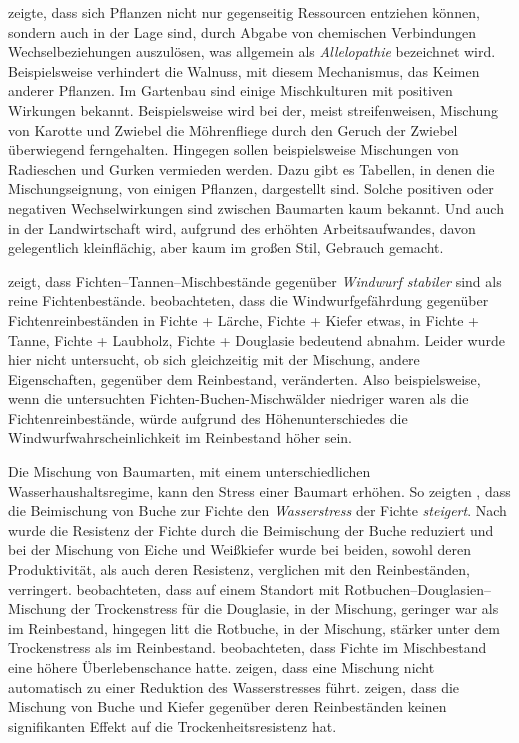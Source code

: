 \documentclass[twocolumn]{scrartcl}
\begin{document}
\cite{molisch1937allelopathie} zeigte, dass sich Pflanzen nicht nur gegenseitig
Ressourcen entziehen können, sondern auch in der Lage sind, durch Abgabe von
chemischen Verbindungen Wechselbeziehungen auszulösen, was allgemein als
\emph{Allelopathie} bezeichnet wird. Beispielsweise verhindert die Walnuss, mit
diesem Mechanismus, das Keimen anderer Pflanzen. Im Gartenbau sind einige
Mischkulturen mit positiven Wirkungen bekannt. Beispielsweise wird bei der,
meist streifenweisen, Mischung von Karotte und Zwiebel die Möhrenfliege durch
den Geruch der Zwiebel überwiegend ferngehalten. Hingegen sollen beispielsweise
Mischungen von Radieschen und Gurken vermieden werden. Dazu gibt es Tabellen, in
denen die Mischungseignung, von einigen Pflanzen, dargestellt sind. Solche
positiven oder negativen Wechselwirkungen sind zwischen Baumarten kaum bekannt.
Und auch in der Landwirtschaft wird, aufgrund des erhöhten Arbeitsaufwandes,
davon gelegentlich kleinflächig, aber kaum im großen Stil, Gebrauch gemacht.

\cite{schmidtVogt1987Sturmstabilitaet} zeigt, dass
Fichten--Tannen--Mischbestände gegenüber \emph{Windwurf stabiler} sind
als reine Fichtenbestände. \cite{schuetz2006stabilitaetMischbestand}
beobachteten, dass die Windwurfgefährdung gegenüber
Fichtenreinbeständen in Fichte + Lärche, Fichte + Kiefer etwas, in
Fichte + Tanne, Fichte + Laubholz, Fichte + Douglasie bedeutend
abnahm. Leider wurde hier nicht untersucht, ob sich gleichzeitig mit
der Mischung, andere Eigenschaften, gegenüber dem Reinbestand,
veränderten. Also beispielsweise, wenn die untersuchten
Fichten-Buchen-Mischwälder niedriger waren als die
Fichtenreinbestände, würde aufgrund des Höhenunterschiedes die
Windwurfwahrscheinlichkeit im Reinbestand höher sein.

Die Mischung von Baumarten, mit einem unterschiedlichen
Wasserhaushaltsregime, kann den Stress einer Baumart erhöhen. So
zeigten \cite{schume2004wasserFichteBuche}, dass die Beimischung von
Buche zur Fichte den \emph{Wasserstress} der Fichte
\emph{steigert}. Nach \cite{nothdurft2020mischbestand} wurde die
Resistenz der Fichte durch die Beimischung der Buche reduziert und bei
der Mischung von Eiche und Weißkiefer wurde bei beiden, sowohl deren
Produktivität, als auch deren Resistenz, verglichen mit den
Reinbeständen, verringert. \cite{thurm2016mischungDougBuStress}
beobachteten, dass auf einem Standort mit
Rotbuchen--Douglasien--Mischung der Trockenstress für die Douglasie,
in der Mischung, geringer war als im Reinbestand, hingegen litt die
Rotbuche, in der Mischung, stärker unter dem Trockenstress als im
Reinbestand. \cite{neuner2015FichteAusfall} beobachteten, dass Fichte
im Mischbestand eine höhere Überlebenschance
hatte. \cite{schnabel2022mischwaldTrockenstress} zeigen, dass eine
Mischung nicht automatisch zu einer Reduktion des Wasserstresses führt.
\cite{streel2022Mischbestand} zeigen, dass die Mischung von Buche und Kiefer
gegenüber deren Reinbeständen keinen signifikanten Effekt auf die
Trockenheitsresistenz hat.
\end{document}
